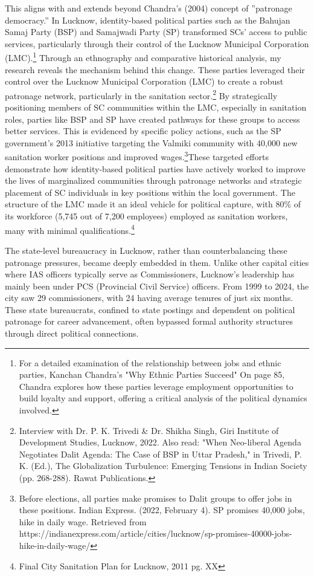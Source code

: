 This aligns with and extends beyond Chandra’s (2004) concept of
”patronage democracy.” In Lucknow, identity-based political parties such as the Bahujan
Samaj Party (BSP) and Samajwadi Party (SP) transformed SCs’ access to public services,
particularly through their control of the Lucknow Municipal Corporation (LMC).\footnote{For a detailed examination of the relationship between jobs and ethnic parties, Kanchan Chandra’s "Why Ethnic Parties Succeed"  On page 85, Chandra explores how these parties leverage employment opportunities to build loyalty and support, offering a critical analysis of the political dynamics involved.
} Through
an ethnography and comparative historical analysis, my research reveals the mechanism
behind this change. These parties leveraged their control over the Lucknow Municipal
Corporation (LMC) to create a robust patronage network, particularly in the sanitation
sector.\footnote{Interview with Dr. P. K. Trivedi & Dr. Shikha Singh, Giri Institute of Development Studies, Lucknow, 2022. Also read: "When Neo-liberal Agenda Negotiates Dalit Agenda: The Case of BSP in Uttar Pradesh," in Trivedi, P. K. (Ed.), The Globalization Turbulence: Emerging Tensions in Indian Society (pp. 268-288). Rawat Publications.
} By strategically positioning members of SC communities within the LMC, especially in sanitation roles, parties like BSP and SP have created pathways for these groups
to access better services. This is evidenced by specific policy actions, such as the SP government’s 2013 initiative targeting the Valmiki community with 40,000 new sanitation worker
positions and improved wages.\footnote{Before elections, all parties make promises to Dalit groups to offer jobs in these positions. Indian Express. (2022, February 4). SP promises 40,000 jobs, hike in daily wage. Retrieved from https://indianexpress.com/article/cities/lucknow/sp-promises-40000-jobs-hike-in-daily-wage/
}These targeted efforts demonstrate how identity-based
political parties have actively worked to improve the lives of marginalized communities
through patronage networks and strategic placement of SC individuals in key positions
within the local government. The structure of the LMC made it an ideal vehicle for political capture, with 80\% of its workforce (5,745 out of 7,200 employees) employed as sanitation workers, many with minimal qualifications.\footnote{ Final City Sanitation Plan for Lucknow, 2011 pg. XX
}

The state-level bureaucracy in Lucknow, rather than counterbalancing these patronage pressures, became deeply embedded in them. Unlike other capital cities where IAS officers typically serve as Commissioners, Lucknow's leadership has mainly been under PCS (Provincial Civil Service) officers. From 1999 to 2024, the city saw 29 commissioners, with 24 having average tenures of just six months. These state bureaucrats, confined to state postings and dependent on political patronage for career advancement, often bypassed formal authority structures through direct political connections. 

